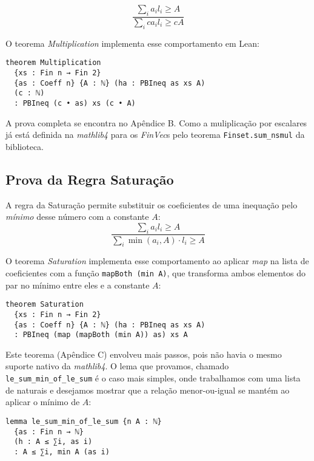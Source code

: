 \documentclass[conference]{IEEEtran}
\begin{document}
\begin{equation}
    \frac
    {\sum_i{a_i l_i} \ge A}
    {\sum_i{c a_i l_i} \ge c A}
\end{equation}

O teorema \textit{Multiplication} implementa esse comportamento em Lean:
\begin{verbatim}
theorem Multiplication
  {xs : Fin n → Fin 2}
  {as : Coeff n} {A : ℕ} (ha : PBIneq as xs A)
  (c : ℕ)
  : PBIneq (c • as) xs (c • A)
\end{verbatim}

A prova completa se encontra no Apêndice B. Como a muliplicação por escalares já está definida na \textit{mathlib4} para
os \textit{FinVec}s pelo teorema \texttt{Finset.sum\_nsmul} da biblioteca.

\subsection{Prova da Regra Saturação}
A regra da Saturação permite substituir os coeficientes de uma inequação pelo \textit{mínimo} desse número com a constante $A$:
\begin{equation}
    \frac
    {\sum_i{a_i l_i} \ge A}
    {\sum_i{ \min(a_i,A)\cdot l_i} \ge A}
\end{equation}

O teorema \textit{Saturation} implementa esse comportamento ao aplicar \textit{map} na lista de coeficientes com a função
\texttt{mapBoth (min A)}, que transforma ambos elementos do par no mínimo entre eles e a constante $A$:
\begin{verbatim}
theorem Saturation
  {xs : Fin n → Fin 2}
  {as : Coeff n} {A : ℕ} (ha : PBIneq as xs A)
  : PBIneq (map (mapBoth (min A)) as) xs A
\end{verbatim}

Este teorema (Apêndice C) envolveu mais passos, pois não havia o mesmo suporte nativo da \textit{mathlib4}.
O lema que provamos, chamado \texttt{le\_sum\_min\_of\_le\_sum} é o caso mais simples, onde trabalhamos com uma
lista de naturais e desejamos mostrar que a relação menor-ou-igual se mantém ao aplicar o mínimo de $A$:
\begin{verbatim}
lemma le_sum_min_of_le_sum {n A : ℕ}
  {as : Fin n → ℕ}
  (h : A ≤ ∑i, as i)
  : A ≤ ∑i, min A (as i)
\end{verbatim}
\end{document}
